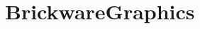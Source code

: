 \hypertarget{group__BrickwareGraphics}{}\section{Brickware\+Graphics}
\label{group__BrickwareGraphics}
